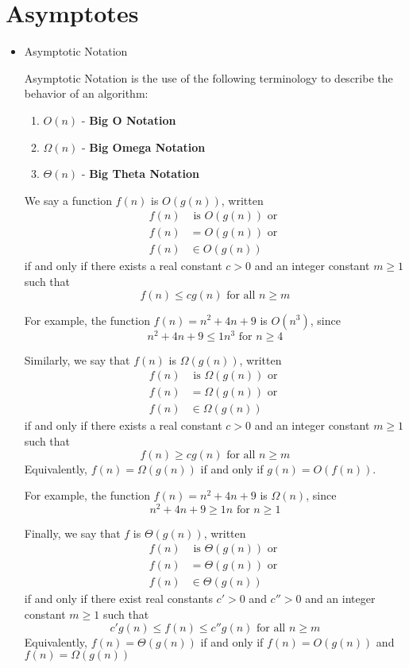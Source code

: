 \documentclass[a4paper]{article}
\begin{document}
\section{Asymptotes}
\begin{itemize}
\item Asymptotic Notation

Asymptotic Notation is the use of the following terminology to describe the behavior of an algorithm:
\begin{enumerate}
\item $O(n)$ - \textbf{Big O Notation}
\item $\Omega(n)$ - \textbf{Big Omega Notation}
\item $\Theta(n)$ - \textbf{Big Theta Notation}
\end{enumerate}

We say a function $f(n)$ is $O(g(n))$, written \begin{align*}f(n) &\text{ is } O(g(n))\text{ or }\\f(n)&=O(g(n))\text{ or }\\f(n)&\in O(g(n))\end{align*} if and only if there exists a real constant $c>0$ and an integer constant $m\geq1$ such that \[f(n)\leq cg(n) \text{ for all }n\geq m\] 

For example, the function $f(n)=n^2+4n+9$ is $O(n^3)$, since \[n^2+4n+9\leq 1n^3\text{ for } n\geq4\]

Similarly, we say that $f(n)$ is $\Omega(g(n))$, written \begin{align*}f(n) &\text{ is } \Omega(g(n))\text{ or }\\f(n)&=\Omega(g(n))\text{ or }\\f(n)&\in \Omega(g(n))\end{align*} if and only if there exists a real constant $c>0$ and an integer constant $m\geq1$ such that \[f(n)\geq cg(n) \text{ for all }n\geq m\] Equivalently, $f(n)=\Omega(g(n))$ if and only if $g(n)=O(f(n))$.

For example, the function $f(n)=n^2+4n+9$ is $\Omega(n)$, since \[n^2+4n+9\geq 1n\text{ for }n\geq1\]

Finally, we say that $f$ is $\Theta(g(n))$, written \begin{align*}f(n) &\text{ is } \Theta(g(n))\text{ or }\\f(n)&=\Theta(g(n))\text{ or }\\f(n)&\in \Theta(g(n))\end{align*} if and only if there exist real constants $c'>0$ and $c''>0$ and an integer constant $m\geq1$ such that \[c'g(n) \leq f(n)\leq c''g(n) \text{ for all }n\geq m\] Equivalently, $f(n)=\Theta(g(n))$ if and only if $f(n)=O(g(n))$ and $f(n)=\Omega(g(n))$


\end{itemize}
\end{document}
